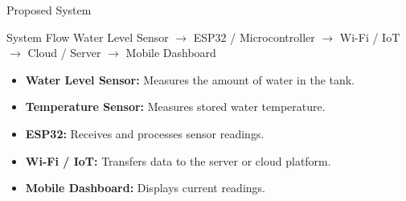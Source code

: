 \documentclass[aspectratio=169]{beamer}
\begin{document}

\begin{frame}{Proposed System}

\centering

\begin{block}{System Flow}
\centering
Water Level Sensor
$\rightarrow$
ESP32 / Microcontroller
$\rightarrow$
Wi-Fi / IoT
$\rightarrow$
Cloud / Server
$\rightarrow$
Mobile Dashboard
\end{block}

\vspace{0.4cm}

\begin{itemize}

    \item \textbf{Water Level Sensor:} Measures the amount of water
    in the tank.

    \item \textbf{Temperature Sensor:} Measures stored water
    temperature.

    \item \textbf{ESP32:} Receives and processes sensor readings.

    \item \textbf{Wi-Fi / IoT:} Transfers data to the server or
    cloud platform.

    \item \textbf{Mobile Dashboard:} Displays current readings.

\end{itemize}

\end{frame}

\end{document}

